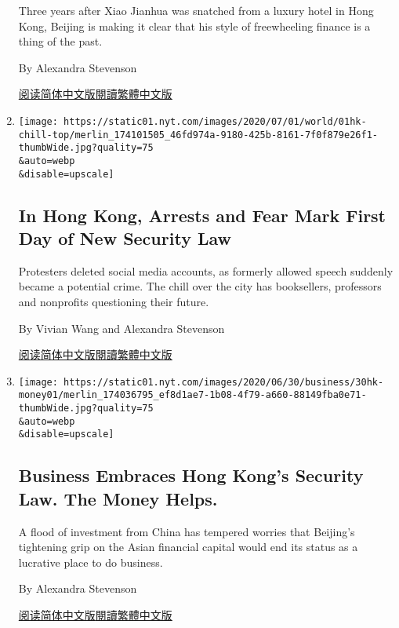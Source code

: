 \begin{enumerate}
  Three years after Xiao Jianhua was snatched from a luxury hotel in
  Hong Kong, Beijing is making it clear that his style of freewheeling
  finance is a thing of the past.

  By Alexandra Stevenson

  \href{https://cn.nytimes.com/business/20200720/china-xiao-jianhua/}{阅读简体中文版}\href{https://cn.nytimes.com/business/20200720/china-xiao-jianhua/zh-hant/}{閱讀繁體中文版}
\item
  \href{/2020/07/01/world/asia/hong-kong-security-law-china.html}{}

  \texttt{[image: https://static01.nyt.com/images/2020/07/01/world/01hk-chill-top/merlin\_174101505\_46fd974a-9180-425b-8161-7f0f879e26f1-thumbWide.jpg?quality=75\\\&auto=webp\\\&disable=upscale]}

  \hypertarget{in-hong-kong-arrests-and-fear-mark-first-day-of-new-security-law}{%
  \subsection{In Hong Kong, Arrests and Fear Mark First Day of New
  Security
  Law}\label{in-hong-kong-arrests-and-fear-mark-first-day-of-new-security-law}}

  Protesters deleted social media accounts, as formerly allowed speech
  suddenly became a potential crime. The chill over the city has
  booksellers, professors and nonprofits questioning their future.

  By Vivian Wang and Alexandra Stevenson

  \href{https://cn.nytimes.com/china/20200702/hong-kong-security-law-china/}{阅读简体中文版}\href{https://cn.nytimes.com/china/20200702/hong-kong-security-law-china/zh-han}{閱讀繁體中文版}
\item
  \href{/2020/06/30/business/china-hong-kong-security-law-business.html}{}

  \texttt{[image: https://static01.nyt.com/images/2020/06/30/business/30hk-money01/merlin\_174036795\_ef8d1ae7-1b08-4f79-a660-88149fba0e71-thumbWide.jpg?quality=75\\\&auto=webp\\\&disable=upscale]}

  \hypertarget{business-embraces-hong-kongs-security-law-the-money-helps}{%
  \subsection{Business Embraces Hong Kong's Security Law. The Money
  Helps.}\label{business-embraces-hong-kongs-security-law-the-money-helps}}

  A flood of investment from China has tempered worries that Beijing's
  tightening grip on the Asian financial capital would end its status as
  a lucrative place to do business.

  By Alexandra Stevenson

  \href{https://cn.nytimes.com/business/20200630/china-hong-kong-security-law-business/}{阅读简体中文版}\href{https://cn.nytimes.com/business/20200630/china-hong-kong-security-law-business/zh-hant/}{閱讀繁體中文版}
\end{enumerate}

